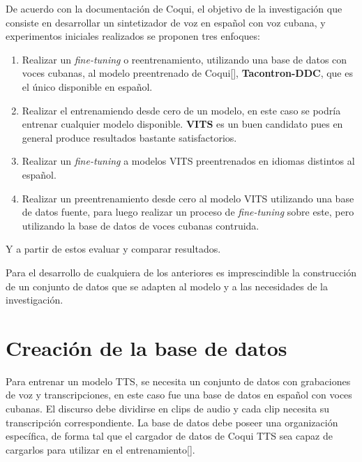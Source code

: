 De acuerdo con la documentación de Coqui, el objetivo de la investigación que consiste en desarrollar un sintetizador de voz en español con voz cubana, y experimentos iniciales realizados se proponen tres enfoques:

\begin{enumerate}
	\item Realizar un \textit{fine-tuning} o reentrenamiento, utilizando una base de datos con voces cubanas, al modelo preentrenado de Coqui[\cite{coqui-doc}], \textbf{Tacontron-DDC}, que es el único disponible en español. 
	
	\item Realizar el entrenamiendo desde cero de un modelo, en este caso se podría entrenar cualquier modelo disponible. \textbf{VITS} es un buen candidato pues en general produce resultados bastante satisfactorios.
	
	\item Realizar un \textit{fine-tuning} a modelos VITS preentrenados en idiomas distintos al español.
	
	\item Realizar un preentrenamiento desde cero al modelo VITS utilizando una base de datos fuente, para luego realizar un proceso de \textit{fine-tuning} sobre este, pero utilizando la base de datos de voces cubanas contruida.
	
	
	
\end{enumerate}

Y a partir de estos evaluar y comparar resultados.

Para el desarrollo de cualquiera de los anteriores es imprescindible la construcción de un conjunto de datos que se adapten al modelo y a las necesidades de la investigación.


\section{Creación de la base de datos} \label{db}

Para entrenar un modelo TTS, se necesita un conjunto de datos con grabaciones de voz y transcripciones, en este caso fue una base de datos en español con voces cubanas. El discurso debe dividirse en clips de audio y cada clip necesita su transcripción correspondiente. La base de datos debe poseer una organización específica, de forma tal que el cargador de datos de Coqui TTS sea capaz de cargarlos para utilizar en el entrenamiento[\cite{formatting-dataset}].    

